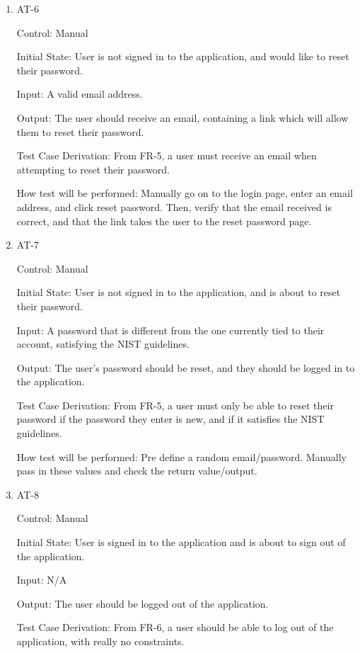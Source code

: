 \documentclass[12pt, titlepage]{article}
\begin{document}
\begin{enumerate}
\item{AT-6\\}

Control: Manual
					
Initial State: User is not signed in to the application, and would like to reset their password.
					
Input: A valid email address.
					
Output: The user should receive an email, containing a link which will allow them to reset their password.

Test Case Derivation: From FR-5, a user must receive an email when attempting to reset their password.

How test will be performed: Manually go on to the login page, enter an email address, and click reset password. Then, verify
that the email received is correct, and that the link takes the user to the reset password page.


\item{AT-7\\}

Control: Manual
					
Initial State: User is not signed in to the application, and is about to reset their password.
					
Input: A password that is different from the one currently tied to their account, satisfying the NIST guidelines.
					
Output: The user's password should be reset, and they should be logged in to the application.

Test Case Derivation: From FR-5, a user must only be able to reset their password if the password they enter is new, and if it 
satisfies the NIST guidelines.

How test will be performed: Pre define a random email/password. Manually pass in these values and check the return value/output.

\item{AT-8\\}

Control: Manual
					
Initial State: User is signed in to the application and is about to sign out of the application.
					
Input: N/A
					
Output: The user should be logged out of the application.

Test Case Derivation: From FR-6, a user should be able to log out of the application, with really no constraints.


\end{enumerate}
\end{document}
